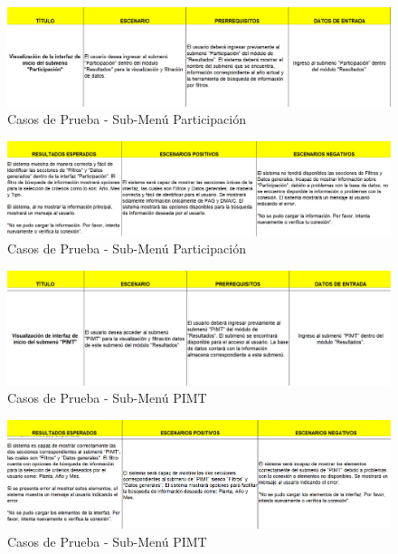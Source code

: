 \documentclass[12pt,letterpaper,spanish, xcolor=table]{report}
\numberwithin{figure}{subsection}
\begin{document}
	\begin{figure}[H]
		\centering
		\includegraphics[width=1.0\textwidth]
		{Imagenes/CenterPoint/CPParticipacion.png}
		\caption{Casos de Prueba - Sub-Menú Participación}\label{a3}
	\end{figure}
	
	\begin{figure}[H]
		\centering
		\includegraphics[width=1.0\textwidth]
		{Imagenes/CenterPoint/CPParticipacion2.png}
		\caption{Casos de Prueba - Sub-Menú Participación}\label{a3}
	\end{figure}
	
	\begin{figure}[H]
		\centering
		\includegraphics[width=1.0\textwidth]
		{Imagenes/CenterPoint/CPPIMT.png}
		\caption{Casos de Prueba - Sub-Menú PIMT}\label{a3}
	\end{figure}
	
	\begin{figure}[H]
		\centering
		\includegraphics[width=1.0\textwidth]
		{Imagenes/CenterPoint/CPPIMT2.png}
		\caption{Casos de Prueba - Sub-Menú PIMT}\label{a3}
	\end{figure}
	
\end{document}

